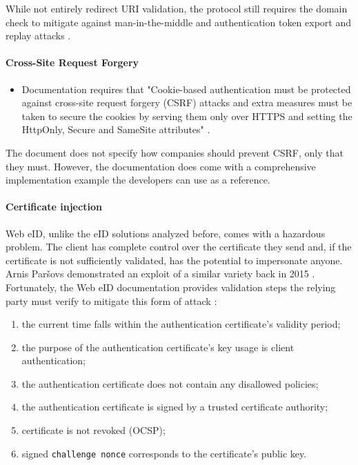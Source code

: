 While not entirely redirect URI validation, the protocol still requires the domain check to mitigate against man-in-the-middle and authentication token export and replay attacks \cite{ria-webeid-systemarchitecture}.

\paragraph{Cross-Site Request Forgery}

\begin{itemize}
  \item Documentation requires that "Cookie-based authentication must be protected against cross-site request forgery (CSRF) attacks and extra measures must be taken to secure the cookies by serving them only over HTTPS and setting the HttpOnly, Secure and SameSite attributes" \cite{ria-webeid-source-web-eid-authtoken-validation-java-readme}.
\end{itemize}

The document does not specify how companies should prevent CSRF, only that they must. However, the documentation does come with a comprehensive implementation example the developers can use as a reference.

\paragraph{Certificate injection}

Web eID, unlike the eID solutions analyzed before, comes with a hazardous problem. The client has complete control over the certificate they send and, if the certificate is not sufficiently validated, has the potential to impersonate anyone. Arnis Paršovs demonstrated an exploit of a similar variety back in 2015 \cite{seb-auth-bypass}. Fortunately, the Web eID documentation provides validation steps the relying party must verify to mitigate this form of attack \cite{ria-webeid-systemarchitecture}:

\begin{enumerate}
  \item the current time falls within the authentication certificate's validity period;
  \item the purpose of the authentication certificate's key usage is client authentication;
  \item the authentication certificate does not contain any disallowed policies;
  \item the authentication certificate is signed by a trusted certificate authority;
  \item certificate is not revoked (OCSP);
  \item signed \texttt{challenge nonce} corresponds to the certificate's public key.
\end{enumerate}

